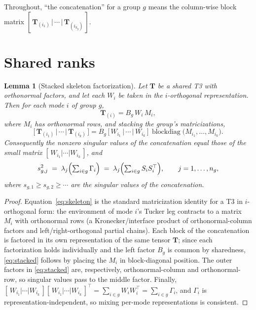 \documentclass[11pt]{article}
\newtheorem{lemma}[theorem]{Lemma}
\theoremstyle{definition}
\theoremstyle{remark}
\newcommand{\T}{\boldsymbol{T}}
\begin{document}
Throughout, ``the concatenation'' for a group $g$ means the column-wise block
matrix $[\,\T_{(i_1)} \,|\, \cdots \,|\, \T_{(i_{k_g})}\,]$.

\section{Shared ranks}\label{sec:ranks}

\begin{lemma}[Stacked skeleton factorization]\label{lem:skeleton}
Let $\T$ be a shared T3 with orthonormal factors, and let each $W_i$ be taken
in the $i$-orthogonal representation. Then for each mode $i$ of group $g$,
\begin{equation}\label{eq:skeleton}
\T_{(i)} = B_g\, W_i\, M_i,
\end{equation}
where $M_i$ has orthonormal rows, and stacking the group's matricizations,
\begin{equation}\label{eq:stacked}
\bigl[\,\T_{(i_1)} \,|\, \cdots \,|\, \T_{(i_k)}\,\bigr]
= B_g \,\bigl[\, W_{i_1} \,|\, \cdots \,|\, W_{i_k} \,\bigr]\,
\operatorname{blockdiag}\!\bigl(M_{i_1}, \ldots, M_{i_k}\bigr).
\end{equation}
Consequently the nonzero singular values of the concatenation equal those of
the small matrix $[\,W_{i_1} | \cdots | W_{i_k}\,]$, and
\begin{equation}\label{eq:specid}
s_{g,j}^2 \;=\;
\lambda_j\Bigl(\textstyle\sum_{i \in g} \Gamma_i\Bigr)
\;=\;
\lambda_j\Bigl(\textstyle\sum_{i \in g} S_i S_i^\top\Bigr),
\qquad j = 1, \ldots, n_g,
\end{equation}
where $s_{g,1} \geq s_{g,2} \geq \cdots$ are the singular values of the
concatenation.
\end{lemma}

\begin{proof}
Equation~\eqref{eq:skeleton} is the standard matricization identity for a T3
in $i$-orthogonal form: the environment of mode $i$'s Tucker leg contracts to
a matrix $M_i$ with orthonormal rows (a Kronecker/interface product of
orthonormal-column factors and left/right-orthogonal partial chains).
Each block of the concatenation is factored in its own representation of the
same tensor $\T$; since each factorization holds individually and the left
factor $B_g$ is common by sharedness, \eqref{eq:stacked} follows by placing
the $M_i$ in block-diagonal position. The outer factors in \eqref{eq:stacked}
are, respectively, orthonormal-column and orthonormal-row, so singular values
pass to the middle factor. Finally,
$[\,W_{i_1}|\cdots|W_{i_k}\,][\,W_{i_1}|\cdots|W_{i_k}\,]^\top
= \sum_{i\in g} W_i W_i^\top = \sum_{i\in g} \Gamma_i$, and $\Gamma_i$ is
representation-independent, so mixing per-mode representations is consistent.
\end{proof}
\end{document}
